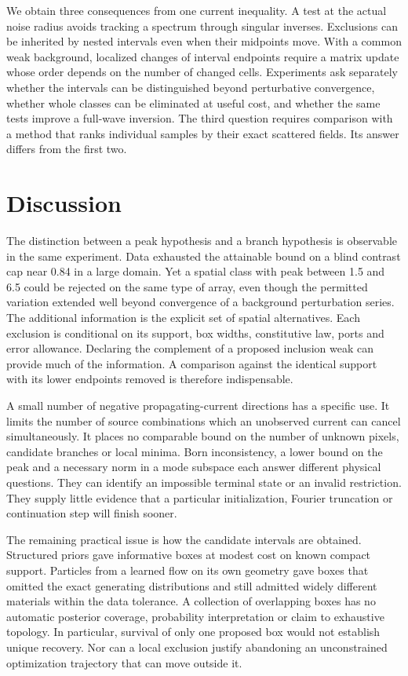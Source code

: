 \documentclass[anonymous,12pt]{iopjournal}
\numberwithin{equation}{section}
\begin{document}
We obtain three consequences from one current inequality. A test at the actual noise radius avoids tracking a spectrum through singular inverses. Exclusions can be inherited by nested intervals even when their midpoints move. With a common weak background, localized changes of interval endpoints require a matrix update whose order depends on the number of changed cells. Experiments ask separately whether the intervals can be distinguished beyond perturbative convergence, whether whole classes can be eliminated at useful cost, and whether the same tests improve a full-wave inversion. The third question requires comparison with a method that ranks individual samples by their exact scattered fields. Its answer differs from the first two.


\section{Discussion}

The distinction between a peak hypothesis and a branch hypothesis is observable in the same experiment. Data exhausted the attainable bound on a blind contrast cap near 0.84 in a large domain. Yet a spatial class with peak between 1.5 and 6.5 could be rejected on the same type of array, even though the permitted variation extended well beyond convergence of a background perturbation series. The additional information is the explicit set of spatial alternatives. Each exclusion is conditional on its support, box widths, constitutive law, ports and error allowance. Declaring the complement of a proposed inclusion weak can provide much of the information. A comparison against the identical support with its lower endpoints removed is therefore indispensable.

A small number of negative propagating-current directions has a specific use. It limits the number of source combinations which an unobserved current can cancel simultaneously. It places no comparable bound on the number of unknown pixels, candidate branches or local minima. Born inconsistency, a lower bound on the peak and a necessary norm in a mode subspace each answer different physical questions. They can identify an impossible terminal state or an invalid restriction. They supply little evidence that a particular initialization, Fourier truncation or continuation step will finish sooner.

The remaining practical issue is how the candidate intervals are obtained. Structured priors gave informative boxes at modest cost on known compact support. Particles from a learned flow on its own geometry gave boxes that omitted the exact generating distributions and still admitted widely different materials within the data tolerance. A collection of overlapping boxes has no automatic posterior coverage, probability interpretation or claim to exhaustive topology. In particular, survival of only one proposed box would not establish unique recovery. Nor can a local exclusion justify abandoning an unconstrained optimization trajectory that can move outside it.
\end{document}
